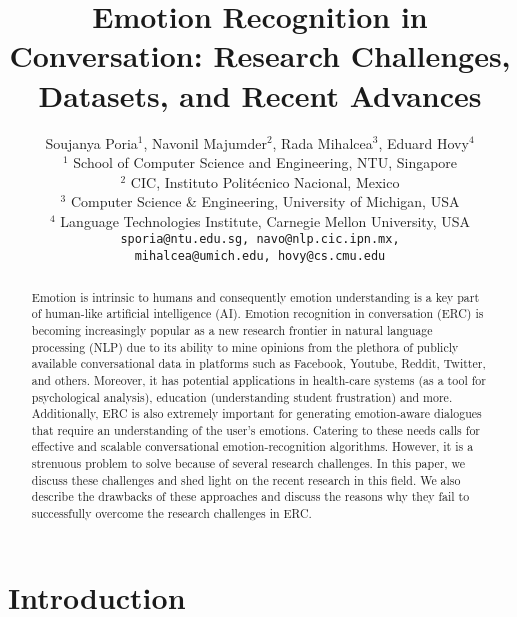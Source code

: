 \documentclass{IEEEtran}\usepackage[pdftex]{graphicx}
\begin{document}
\title{Emotion Recognition in Conversation: Research Challenges, Datasets, and Recent Advances}
	
	\author{Soujanya Poria$^{1}$, Navonil Majumder$^2$, Rada Mihalcea$^3$,
		Eduard Hovy$^4$ \\
		\vspace{5mm}
		\small{ $^1$ School of Computer Science and Engineering, NTU, Singapore} \\
		\small{$^2$ CIC, Instituto Polit\'ecnico Nacional, Mexico} \\
		\small{$^3$ Computer Science \& Engineering, University of Michigan, USA}\\
		\small{ $^4$ Language Technologies Institute, Carnegie Mellon University, USA}\\ 
		\tt sporia@ntu.edu.sg, \tt navo@nlp.cic.ipn.mx, \\
		\tt mihalcea@umich.edu, \tt hovy@cs.cmu.edu  \\
	}
	\maketitle
	


	\begin{abstract}
Emotion is intrinsic to humans and consequently emotion understanding is a key part of human-like
		artificial intelligence (AI).
		Emotion recognition in conversation (ERC) is  becoming increasingly popular as a new research frontier in natural language
		processing (NLP) due to its ability to mine opinions from the plethora of publicly available conversational data in platforms
		such as Facebook, Youtube, Reddit, Twitter, and others. Moreover, it has potential applications in health-care systems (as a
		tool for psychological analysis), education (understanding student frustration) and more. Additionally, ERC is also extremely important for generating emotion-aware dialogues that require an understanding of the user's emotions. Catering
		to these needs calls for effective and scalable conversational emotion-recognition algorithms. However, it is a strenuous problem to solve because of several research challenges. In this paper, we discuss these challenges and shed light on the recent research in this  field. We also describe the drawbacks of these approaches and discuss the reasons why they fail to successfully overcome the research challenges in ERC.
\end{abstract}


	\section{Introduction}
	
\end{document}
